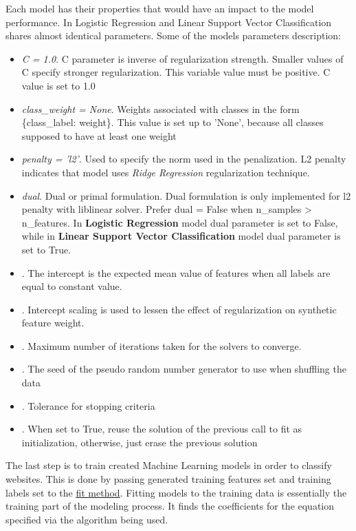 Each model has their properties that would have an impact to the model performance. In Logistic Regression and Linear Support Vector Classification shares almost identical parameters. Some of the models parameters description:
\begin{itemize}
    \item \textit{C = 1.0}. C parameter is inverse of regularization strength. Smaller values of C specify stronger regularization. This variable value must be positive. C value is set to 1.0
    \item \textit{class\_weight = None}. Weights associated with classes in the form \{class\_label: weight\}. This value is set up to 'None', because all classes supposed to have at least one weight
    \item \textit{penalty = 'l2'}. Used to specify the norm used in the penalization. L2 penalty indicates that model uses \textit{Ridge Regression} regularization technique.
    \item \textit{dual}. Dual or primal formulation. Dual formulation is only implemented for l2 penalty with liblinear solver. Prefer dual = False when n\_samples > n\_features. In \textbf{Logistic Regression} model dual parameter is set to False, while in \textbf{Linear Support Vector Classification} model dual parameter is set to True.
    \item {}. The intercept is the expected mean value of features when all labels are equal to constant value.
    \item {}. Intercept scaling is used to lessen the effect of regularization on synthetic feature weight.
    \item {}. Maximum number of iterations taken for the solvers to converge.
    \item {}. The seed of the pseudo random number generator to use when shuffling the data
    \item {}. Tolerance for stopping criteria
    \item {}. When set to True, reuse the solution of the previous call to fit as initialization, otherwise, just erase the previous solution
\end{itemize}


The last step is to train created Machine Learning models in order to classify websites. This is done by passing generated training features set and training labels set to the \href{https://scikit-learn.org/stable/modules/generated/sklearn.linear_model.LinearRegression.html}{fit method}. Fitting models to the training data is essentially the training part of the modeling process. It finds the coefficients for the equation specified via the algorithm being used. 

